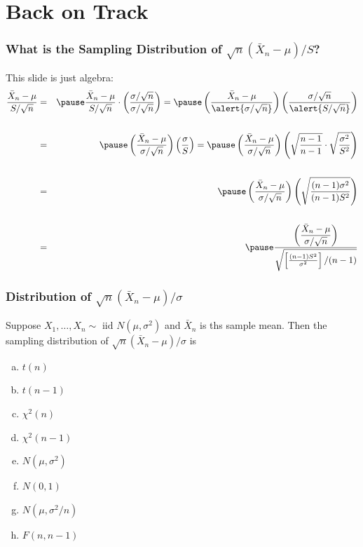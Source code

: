 \documentclass{beamer}
\begin{document}
\section{Back on Track}
\begin{frame}
\frametitle{What is the Sampling Distribution of $\sqrt{n}(\bar{X}_n-\mu)/S$?}
This slide is just algebra:
\begin{eqnarray*}
	\frac{\bar{X}_n - \mu}{S/\sqrt{n}} &=&\pause \frac{\bar{X}_n - \mu}{S/\sqrt{n}} \cdot \left(\frac{\sigma/\sqrt{n}}{\sigma/\sqrt{n}} \right) = \pause \left(\frac{\bar{X}_n - \mu}{\alert{\sigma/\sqrt{n}}} \right)\left(\frac{\sigma/\sqrt{n}}{\alert{S/\sqrt{n}}} \right)\\ \\
	&=& \pause\left(\frac{\bar{X}_n - \mu}{\sigma/\sqrt{n}} \right)\left(\frac{\sigma}{S} \right) = \pause  \left(\frac{\bar{X}_n - \mu}{\sigma/\sqrt{n}} \right)\left(\sqrt{\frac{n-1}{n-1}}\cdot\sqrt{\frac{\sigma^2}{S^2}} \right) \\ \\
	&=& \pause \left(\frac{\bar{X}_n - \mu}{\sigma/\sqrt{n}} \right)\left(\sqrt{\frac{(n-1)\sigma^2}{(n-1)S^2}} \right) \\ \\
	&=& \pause \frac{\displaystyle \left(\frac{\bar{X}_n - \mu}{\sigma/\sqrt{n}}\right)}{\sqrt{\left[\frac{(n-1)S^2}{\sigma^2}\right]/(n-1)}} 
\end{eqnarray*}
\end{frame}

\begin{frame}[t]
\frametitle{Distribution of $\sqrt{n}(\bar{X}_n - \mu)/\sigma$ }
    
    Suppose $X_1, \hdots, X_n \sim \mbox{ iid } N(\mu, \sigma^2)$ and $\bar{X}_n$ is ths sample mean. Then the sampling distribution of \alert{$\sqrt{n}(\bar{X}_n - \mu)/\sigma$} is

    \begin{enumerate}[(a)]
    	\item $t(n)$
    	\item $t(n-1)$
    	\item $\chi^2(n)$
    	\item $\chi^2(n-1)$
    	\item $N(\mu, \sigma^2)$
    	\item $N(0,1)$
    	\item $N(\mu, \sigma^2/n)$
    	\item $F(n, n-1)$
    \end{enumerate}


\end{frame}
\end{document}

